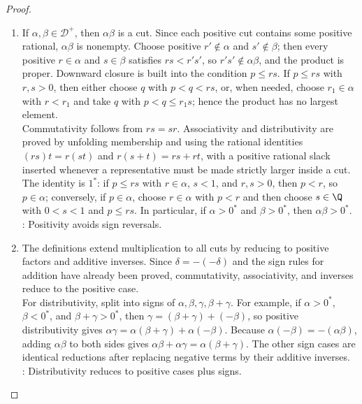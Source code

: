 \begin{theorem}
\begin{proof}
\begin{enumerate}[label=(\roman*)]
\item {}
If $\alpha,\beta\in\mathscr{D}^+$, then $\alpha\beta$ is a cut. Since each positive cut contains some positive rational, $\alpha\beta$ is nonempty. Choose positive $r'\notin\alpha$ and $s'\notin\beta$; then every positive $r\in\alpha$ and $s\in\beta$ satisfies $rs<r's'$, so $r's'\notin\alpha\beta$, and the product is proper. Downward closure is built into the condition $p\leq rs$. If $p\leq rs$ with $r,s>0$, then either choose $q$ with $p<q<rs$, or, when needed, choose $r_1\in\alpha$ with $r<r_1$ and take $q$ with $p<q\leq r_1s$; hence the product has no largest element.\\
Commutativity follows from $rs=sr$. Associativity and distributivity are proved by unfolding membership and using the rational identities $(rs)t=r(st)$ and $r(s+t)=rs+rt$, with a positive rational slack inserted whenever a representative must be made strictly larger inside a cut. The identity is $1^*$: if $p\leq rs$ with $r\in\alpha$, $s<1$, and $r,s>0$, then $p<r$, so $p\in\alpha$; conversely, if $p\in\alpha$, choose $r\in\alpha$ with $p<r$ and then choose $s\in\Q$ with $0<s<1$ and $p\leq rs$. In particular, if $\alpha>0^*$ and $\beta>0^*$, then $\alpha\beta>0^*$.\\
: Positivity avoids sign reversals.

\item {}
The definitions extend multiplication to all cuts by reducing to positive factors and additive inverses. Since $\delta=-(-\delta)$ and the sign rules for addition have already been proved, commutativity, associativity, and inverses reduce to the positive case.\\
For distributivity, split into signs of $\alpha,\beta,\gamma,\beta+\gamma$. For example, if $\alpha>0^*$, $\beta<0^*$, and $\beta+\gamma>0^*$, then $\gamma=(\beta+\gamma)+(-\beta)$, so positive distributivity gives $\alpha\gamma=\alpha(\beta+\gamma)+\alpha(-\beta)$. Because $\alpha(-\beta)=-(\alpha\beta)$, adding $\alpha\beta$ to both sides gives $\alpha\beta+\alpha\gamma=\alpha(\beta+\gamma)$. The other sign cases are identical reductions after replacing negative terms by their additive inverses.\\
: Distributivity reduces to positive cases plus signs.


\end{enumerate}
\end{proof}
\end{theorem}
